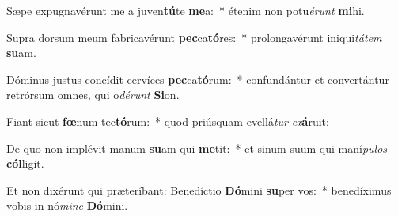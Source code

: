 \item Sæpe expugnavérunt me a juven\textbf{tú}te \textbf{me}a:~* étenim non potu\textit{é}\textit{runt} \textbf{mi}hi.
\item Supra dorsum meum fabricavérunt \textbf{pec}ca\textbf{tó}res:~* prolongavérunt iniqui\textit{tá}\textit{tem} \textbf{su}am.
\item Dóminus justus concídit cervíces \textbf{pec}ca\textbf{tó}rum:~* confundántur et convertántur retrórsum omnes, qui o\textit{dé}\textit{runt} \textbf{Si}on.
\item Fiant sicut \textbf{fœ}num tec\textbf{tó}rum:~* quod priúsquam evellá\textit{tur} \textit{ex}\textbf{á}ruit:
\item De quo non implévit manum \textbf{su}am qui \textbf{me}tit:~* et sinum suum qui maní\textit{pu}\textit{los} \textbf{cól}ligit.
\item Et non dixérunt qui præteríbant: Benedíctio \textbf{Dó}mini \textbf{su}per vos:~* benedíximus vobis in nó\textit{mi}\textit{ne} \textbf{Dó}mini.
